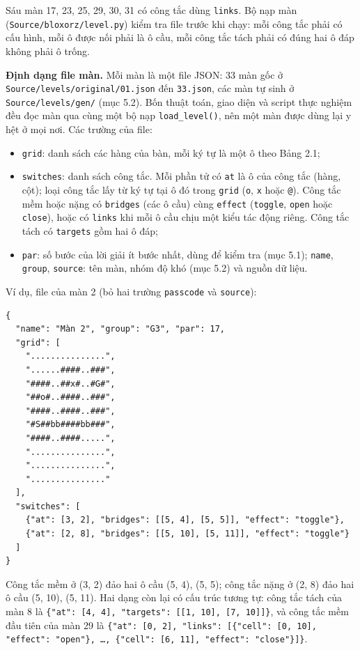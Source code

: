 Sáu màn 17, 23, 25, 29, 30, 31 có công tắc dùng \texttt{links}. Bộ nạp màn (\texttt{Source/\allowbreak{}bloxorz/\allowbreak{}level.\allowbreak{}py}) kiểm tra file trước khi chạy: mỗi công tắc phải có cấu hình, mỗi ô được nối phải là ô cầu, mỗi công tắc tách phải có đúng hai ô đáp không phải ô trống.

\textbf{Định dạng file màn.} Mỗi màn là một file JSON: 33 màn gốc ở \texttt{Source/\allowbreak{}levels/\allowbreak{}original/\allowbreak{}01.\allowbreak{}json} đến \texttt{33.\allowbreak{}json}, các màn tự sinh ở \texttt{Source/\allowbreak{}levels/\allowbreak{}gen/\allowbreak{}} (mục 5.2). Bốn thuật toán, giao diện và script thực nghiệm đều đọc màn qua cùng một bộ nạp \texttt{load\_\allowbreak{}level()}, nên một màn được dùng lại y hệt ở mọi nơi. Các trường của file:

\begin{itemize}
\tightlist
\item
  \texttt{grid}: danh sách các hàng của bàn, mỗi ký tự là một ô theo Bảng 2.1;
\item
  \texttt{switches}: danh sách công tắc. Mỗi phần tử có \texttt{at} là ô của công tắc (hàng, cột); loại công tắc lấy từ ký tự tại ô đó trong \texttt{grid} (\texttt{o}, \texttt{x} hoặc \texttt{@}). Công tắc mềm hoặc nặng có \texttt{bridges} (các ô cầu) cùng \texttt{effect} (\texttt{toggle}, \texttt{open} hoặc \texttt{close}), hoặc có \texttt{links} khi mỗi ô cầu chịu một kiểu tác động riêng. Công tắc tách có \texttt{targets} gồm hai ô đáp;
\item
  \texttt{par}: số bước của lời giải ít bước nhất, dùng để kiểm tra (mục 5.1); \texttt{name}, \texttt{group}, \texttt{source}: tên màn, nhóm độ khó (mục 5.2) và nguồn dữ liệu.
\end{itemize}

Ví dụ, file của màn 2 (bỏ hai trường \texttt{passcode} và \texttt{source}):

\begin{verbatim}
{
  "name": "Màn 2", "group": "G3", "par": 17,
  "grid": [
    "...............",
    "......####..###",
    "####..##x#..#G#",
    "##o#..####..###",
    "####..####..###",
    "#S##bb####bb###",
    "####..####.....",
    "...............",
    "...............",
    "..............."
  ],
  "switches": [
    {"at": [3, 2], "bridges": [[5, 4], [5, 5]], "effect": "toggle"},
    {"at": [2, 8], "bridges": [[5, 10], [5, 11]], "effect": "toggle"}
  ]
}
\end{verbatim}

Công tắc mềm ở (3, 2) đảo hai ô cầu (5, 4), (5, 5); công tắc nặng ở (2, 8) đảo hai ô cầu (5, 10), (5, 11). Hai dạng còn lại có cấu trúc tương tự: công tắc tách của màn 8 là \texttt{\{"at": [4, 4], "targets": [[1, 10], [7, 10]]\}}, và công tắc mềm đầu tiên của màn 29 là \texttt{\{"at": [0, 2], "links": [\{"cell": [0, 10], "effect": "open"\}, …, \{"cell": [6, 11], "effect": "close"\}]\}}.

